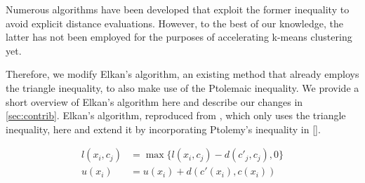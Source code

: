 Numerous algorithms have been developed that exploit the former inequality to avoid explicit distance evaluations. However, to the best of our knowledge, the latter has not been employed for the purposes of accelerating k-means clustering yet.

Therefore, we modify Elkan's algorithm, an existing method that already employs the triangle inequality, to also make use of the Ptolemaic inequality.
We provide a short overview of Elkan's algorithm here and describe our changes in \autoref{sec:contrib}.
Elkan's algorithm, reproduced from \cite{}, which only uses the triangle inequality, here and extend it by incorporating Ptolemy's inequality in \autoref{}.


\begin{align}
  \label{eq:elkan_lower}
  l(x_i, c_j) &= \max \{ l(x_i, c_j) - d(c'_j, c_j), 0 \} \\
  \label{eq:elkan_upper}
  u(x_i) &= u(x_i) + d(c'(x_i), c(x_i))
\end{align}




